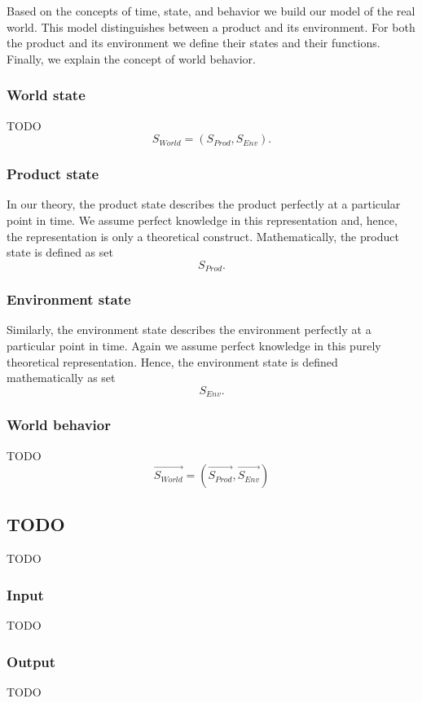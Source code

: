 \documentclass[conference]{IEEEtran}
\begin{document}
    Based on the concepts of time, state, and behavior we build our model of the real world.
    This model distinguishes between a product and its environment.
    For both the product and its environment we define their states and their functions.
    Finally, we explain the concept of world behavior.

    \subsubsection{World state}
    TODO
    \[
        S_{World} = (S_{Prod}, S_{Env}).
    \]

    \subsubsection{Product state}
    In our theory, the product state describes the product perfectly at a particular point in time.
    We assume perfect knowledge in this representation and, hence, the representation is only a theoretical construct.
    Mathematically, the product state is defined as set
    \[
        S_{Prod}.
    \]

    \subsubsection{Environment state}
    Similarly, the environment state describes the environment perfectly at a particular point in time.
    Again we assume perfect knowledge in this purely theoretical representation.
    Hence, the environment state is defined mathematically as set
    \[
        S_{Env}.
    \]

    \subsubsection{World behavior}
    TODO
    \[
        \overrightarrow{S_{World}} = (\overrightarrow{S_{Prod}}, \overrightarrow{S_{Env}})
    \]

    \subsection{TODO}
    TODO

    \subsubsection{Input}
    TODO

    \subsubsection{Output}
    TODO
\end{document}
